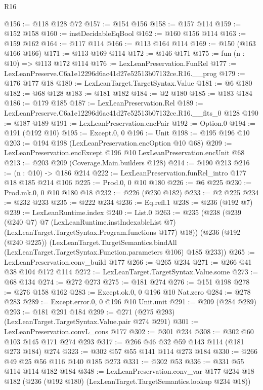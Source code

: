 \begin{lexlean}{R16}
\begin{coremodule}
@156 := @118 @128 @72
@157 := @154 @156
@158 := @157 @114
@159 := @152 @158
@160 := instDecidableEqBool
@162 := @160 @156 @114
@163 := @159 @162
@164 := @117 @114
@166 := @113 @164 @114
@169 := @150 (@163 @166 @166)
@171 := @113 @169 @114
@172 := @146 @171
@175 := fun (n : @10) => @113 @172 @114
@176 := LexLeanPreservation.FunRel
@177 := LexLeanPreserve.C6a1e12296d6ac41d27e52513b07132ce.R16.__prog
@179 := @176 @177 @18
@180 := LexLeanTarget.TargetSyntax.Value
@181 := @6 @180
@182 := @68 @128
@183 := @181 @182
@184 := @2 @180
@185 := @183 @184
@186 := @179 @185
@187 := LexLeanPreservation.Rel
@189 := LexLeanPreserve.C6a1e12296d6ac41d27e52513b07132ce.R16.__fits_0 @128
@190 := @187 @189
@191 := LexLeanPreservation.encPair
@192 := Option.{0}
@194 := @191 (@192 @10)
@195 := Except.{0, 0}
@196 := Unit
@198 := @195 @196 @10
@203 := @194 @198 (LexLeanPreservation.encOption @10 @68)
@209 := LexLeanPreservation.encExcept @196 @10 LexLeanPreservation.encUnit @68
@213 := @203 @209 (Coverage.Main.builders @128)
@214 := @190 @213
@216 := (n : @10) -> @186 @214
@222 := LexLeanPreservation.funRel_intro @177 @18 @185 @214 @106
@225 := Prod.{0, 0} @10 @180
@226 := @6 @225
@230 := Prod.mk.{0, 0} @10 @180 @18
@232 := @226 (@230 @182)
@233 := @2 @225
@234 := @232 @233
@235 := @222 @234
@236 := Eq.refl.{1}
@238 := @236 (@192 @7)
@239 := LexLeanRuntime.index
@240 := List.{0}
@263 := @235
    (@238
      (@239
        (@240 @7)
        @7
        (LexLeanRuntime.instIndexableList @7)
        (LexLeanTarget.TargetSyntax.Program.functions @177)
        @18))
    (@236
      (@192 (@240 @225))
      (LexLeanTarget.TargetSemantics.bindAll
        (LexLeanTarget.TargetSyntax.Function.parameters @106)
        @185
        @233))
@265 := LexLeanPreservation.conv_build @177
@266 := @265 @234
@271 := @266 @41 @38 @104 @172 @114
@272 := LexLeanTarget.TargetSyntax.Value.some
@273 := @68 @134
@274 := @272 @273
@275 := @181 @274
@276 := @151 @198
@278 := @276 @158 @162
@283 := Except.ok.{0, 0} @196 @10 Nat.zero
@284 := @278 @283
@289 := Except.error.{0, 0} @196 @10 Unit.unit
@291 := @209 (@284 @289)
@293 := @181 @291 @184
@299 := @271 (@275 @293) (LexLeanTarget.TargetSyntax.Value.pair @274 @291)
@301 := LexLeanPreservation.convL_cons @177
@302 := @301 @234
@308 := @302 @60 @103 @145 @171 @274 @293
@317 := @266 @46 @32 @59 @143 @114 (@181 @273 @184) @274
@323 := @302 @57 @55 @141 @114 @273 @184
@330 := @266 @49 @25 @56 @116 @140 @185 @273
@331 := @302 @53
@336 := @331 @55 @114 @114 @182 @184
@348 := LexLeanPreservation.conv_var
    @177
    @234
    @18
    @182
    (@236 (@192 @180) (LexLeanTarget.TargetSemantics.lookup @234 @18))

\end{coremodule}
\end{lexlean}
